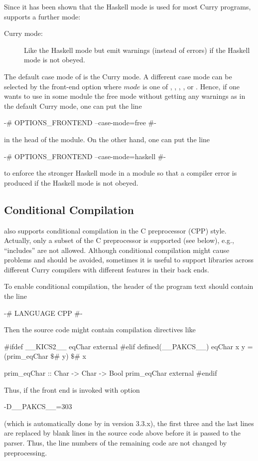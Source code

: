 Since it has been shown that the Haskell mode is used for most
Curry programs, \CYS supports a further mode:
%
\begin{description}
\item[Curry mode:]
Like the Haskell mode but emit warnings (instead of errors)
if the Haskell mode is not obeyed.
\end{description}
%
The default case mode of \CYS is the Curry mode.
A different case mode can be selected by the front-end option
 where $\mathit{mode}$
is one of , , , ,
or .
Hence, if one wants to use in some module
the free mode without getting any warnings
as in the default Curry mode, one can put the line
%
\begin{curry}
{-# OPTIONS_FRONTEND --case-mode=free #-}
\end{curry}
%
in the head of the module.
On the other hand, one can put the line
%
\begin{curry}
{-# OPTIONS_FRONTEND --case-mode=haskell #-}
\end{curry}
%
to enforce the stronger Haskell mode in a module so that
a compiler error is produced if the Haskell mode is not obeyed.


\subsection{Conditional Compilation}

\CYS also supports conditional compilation
in the C preprocessor (CPP) style.
Actually, only a subset of the C preprocessor is supported (see below),
e.g., ``includes'' are not allowed.
Although conditional compilation might cause problems
and should be avoided, sometimes it is useful to support libraries
across different Curry compilers with different features
in their back ends.

To enable conditional compilation, the header of the program text
should contain the line
%
\begin{curry}
{-# LANGUAGE CPP #-}
\end{curry}
%
Then the source code might contain compilation directives like
%
\begin{curry}
#ifdef __KICS2__
eqChar external
#elif defined(__PAKCS__)
eqChar x y = (prim_eqChar $\$$# y) $\$$# x

prim_eqChar :: Char -> Char -> Bool
prim_eqChar external
#endif
\end{curry}
%
Thus, if the front end is invoked with option
\begin{curry}
-D__PAKCS__=303
\end{curry}
(which is automatically done by \CYS in version 3.3.x),
the first three and the last lines are replaced by blank lines
in the source code above before it is passed to the parser.
Thus, the line numbers of the remaining code are not changed
by preprocessing.

